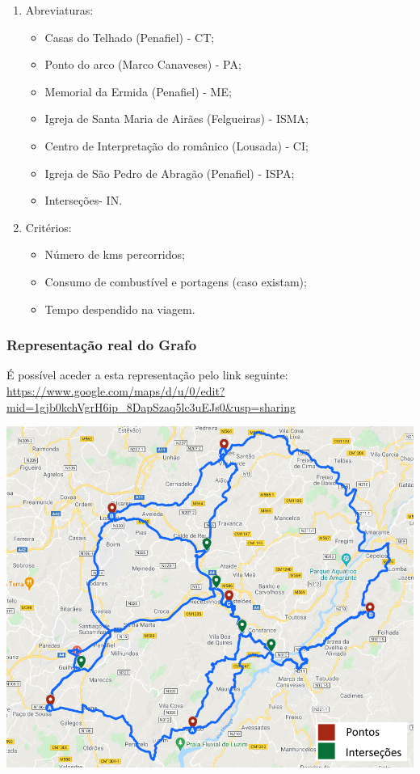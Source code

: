 \documentclass[12pt]{article}
\begin{document}
    \begin{enumerate}
    \item  Abreviaturas:
        \begin{itemize}
        \item   Casas do Telhado (Penafiel) - CT;
        \item   Ponto do arco (Marco Canaveses) - PA;
        \item   Memorial da Ermida (Penafiel) - ME;
        \item   Igreja de Santa Maria de Airães (Felgueiras) - ISMA;
        \item   Centro de Interpretação do românico (Lousada) - CI;
        \item   Igreja de São Pedro de Abragão (Penafiel) - ISPA;
        \item   Interseções- IN.        
    \end{itemize}
    \item  Critérios:
        \begin{itemize}
        \item   Número de kms percorridos;
        \item   Consumo de combustível e portagens (caso existam);
        \item   Tempo despendido na viagem.
        \end{itemize}
    \end{enumerate}
    
    \newpage
    
    \subsubsection{Representação real do Grafo}
    \noindent É possível aceder a esta representação pelo link seguinte: 
    \url{https://www.google.com/maps/d/u/0/edit?mid=1gjb0kchVgrH6ip_8DapSzaq5lc3uEJs0&usp=sharing}
    \\
    \begin{center}
    
        \includegraphics[scale=0.65]{anexos/mapa.png}
    \end{center}
        
\end{document}
